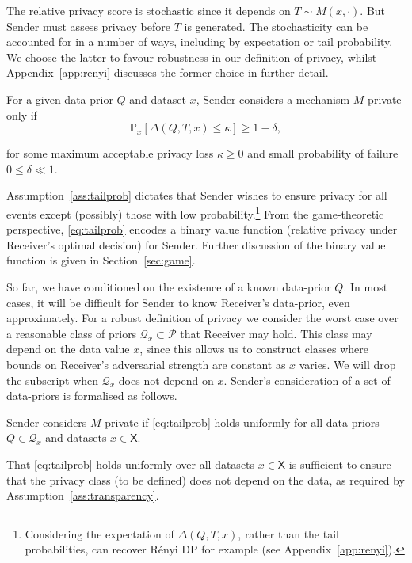 \documentclass{article}
\theoremstyle{plain}
\theoremstyle{plain}
\theoremstyle{definition}
\theoremstyle{remark}
\theoremstyle{plain}
\renewcommand{\Pr}{\mathbb{P}}
\newcommand{\PrMx}{\Pr_{x}}
\newcommand{\xset}{\mathsf{X}}
\begin{document}
The relative privacy score is stochastic since it depends on $T \sim M(x,\cdot)$. But Sender must assess privacy before $T$ is generated. The stochasticity can be accounted for in a number of ways, including by expectation or tail probability. We choose the latter to favour robustness in our definition of privacy, whilst Appendix~\ref{app:renyi} discusses the former choice in further detail.
\begin{assumption}\label{ass:tailprob} For a given data-prior $Q$ and dataset $x$, Sender considers a mechanism $M$ private only if
\begin{equation}\label{eq:tailprob}
    \PrMx\left[\Delta(Q,T,x) \leq \kappa \right] \geq 1 - \delta,
\end{equation}

for some maximum acceptable privacy loss $\kappa\geq0$ and small probability of failure $0 \leq \delta \ll 1$.
\end{assumption}
Assumption~\ref{ass:tailprob} dictates that Sender wishes to ensure privacy for all events except (possibly) those with low probability.\footnote{Considering the expectation of $\Delta(Q,T,x)$, rather than the tail probabilities, can recover R\'{e}nyi DP for example (see Appendix~\ref{app:renyi}).} From the game-theoretic perspective, \eqref{eq:tailprob} encodes a binary value function (relative privacy under Receiver's optimal decision) for Sender. Further discussion of the binary value function is given in Section~\ref{sec:game}.

So far, we have conditioned on the existence of a known data-prior $Q$. In most cases, it will be difficult for Sender to know Receiver's data-prior, even approximately.  For a robust definition of privacy we consider the worst case over a reasonable class of priors $\mathcal{Q}_x \subset \mathcal{P}$  that Receiver may hold. This class may depend on the data value $x$, since this allows us to construct classes where bounds on Receiver's adversarial strength are constant as $x$ varies. We will drop the subscript when $\mathcal Q_x$ does not depend on $x$. Sender's consideration of a set of data-priors is formalised as follows.
\begin{assumption}\label{ass:worstpriordataset}
    Sender considers $M$ private if \eqref{eq:tailprob} holds uniformly for all data-priors~$Q \in \mathcal{Q}_x$ and datasets $x \in \xset$. 
\end{assumption}

That \eqref{eq:tailprob} holds uniformly over all datasets $x \in \xset$ is sufficient to ensure that the privacy class (to be defined) does not depend on the data, as required by Assumption~\ref{ass:transparency}.
\end{document}
